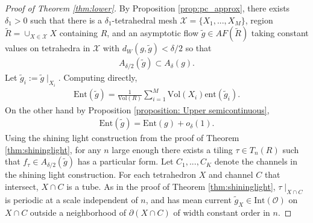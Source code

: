 \documentclass[11pt]{article}
\theoremstyle{remark}
\theoremstyle{definition}
\newcommand{\ent}{\text{ent}}
\newcommand{\Ent}{\text{Ent}}
\newcommand{\mc}[1]{\mathcal{#1}}
\newcommand{\Vol}{\text{Vol}}
\begin{document}
\begin{proof}[Proof of Theorem \ref{thm:lower}]

By Proposition \ref{prop:pc_approx}, there exists $\delta_1>0$ such that there is a $\delta_1$-tetrahedral mesh $\mc X=\{X_1,...,X_M\}$, region $\widetilde R= \cup_{X\in \mc X} X$ containing $R$, and an asymptotic flow $\widetilde g\in AF(\widetilde R)$ taking constant values on tetrahedra in $\mc X$ with $d_W(g,\widetilde g)<\delta/2$ so that 
\begin{align*}
    A_{\delta/2}(\widetilde g) \subset A_\delta(g). 
\end{align*}
Let $\widetilde g_i:=\widetilde g\mid_{X_i}$. Computing directly, 
\begin{align*}
    \Ent(\widetilde g) = \frac{1}{\Vol(R)} \sum_{i=1}^M \Vol(X_i) \ent(\widetilde g_i). 
\end{align*}
On the other hand by Proposition \ref{proposition: Upper semicontinuous}, 
\begin{align*}
    \Ent(\widetilde g) = \Ent(g) + o_{\delta}(1).
\end{align*}
Using the shining light construction from the proof of Theorem \ref{thm:shininglight}, for any $n$ large enough there exists a tiling $\tau \in T_n(R)$ such that $f_\tau\in A_{\delta/2}(\widetilde g)$ has a particular form. Let $C_1,...,C_K$ denote the channels in the shining light construction. For each tetrahedron $X$ and channel $C$ that intersect, $X\cap C$ is a tube. As in the proof of Theorem \ref{thm:shininglight}, $\tau\mid_{X\cap C}$ is periodic at a scale independent of $n$, and has mean current $\widetilde g_X \in \text{Int}(\mc O)$ on $X\cap C$ outside a neighborhood of $\partial(X\cap C)$ of width constant order in $n$. 


\end{proof}
\end{document}
